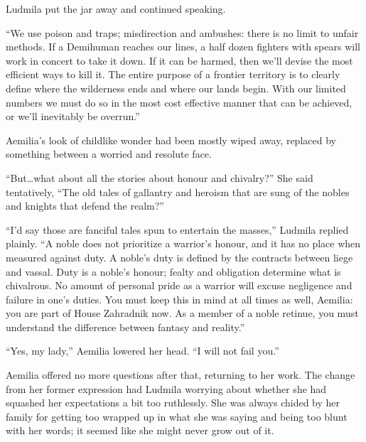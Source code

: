  

Ludmila put the jar away and continued speaking.

 

“We use poison and traps; misdirection and ambushes: there is no limit to unfair methods. If a Demihuman reaches our lines, a half dozen fighters with spears will work in concert to take it down. If it can be harmed, then we’ll devise the most efficient ways to kill it. The entire purpose of a frontier territory is to clearly define where the wilderness ends and where our lands begin. With our limited numbers we must do so in the most cost effective manner that can be achieved, or we’ll inevitably be overrun.”

 

Aemilia’s look of childlike wonder had been mostly wiped away, replaced by something between a worried and resolute face.

 

“But…what about all the stories about honour and chivalry?” She said tentatively, “The old tales of gallantry and heroism that are sung of the nobles and knights that defend the realm?”

 

“I’d say those are fanciful tales spun to entertain the masses,” Ludmila replied plainly. “A noble does not prioritize a warrior’s honour, and it has no place when measured against duty. A noble’s duty is defined by the contracts between liege and vassal. Duty is a noble’s honour; fealty and obligation determine what is chivalrous. No amount of personal pride as a warrior will excuse negligence and failure in one’s duties. You must keep this in mind at all times as well, Aemilia: you are part of House Zahradnik now. As a member of a noble retinue, you must understand the difference between fantasy and reality.”

 

“Yes, my lady,” Aemilia lowered her head. “I will not fail you.”

 

Aemilia offered no more questions after that, returning to her work. The change from her former expression had Ludmila worrying about whether she had squashed her expectations a bit too ruthlessly. She was always chided by her family for getting too wrapped up in what she was saying and being too blunt with her words; it seemed like she might never grow out of it.

 


